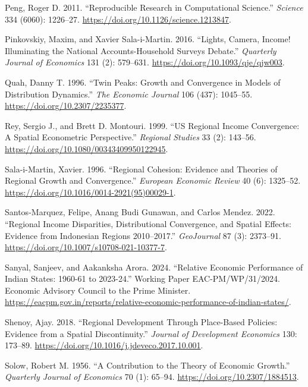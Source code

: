 \documentclass[
  letterpaper,
  DIV=11,
  numbers=noendperiod]{scrartcl}
\newlength{\cslhangindent}
\newenvironment{CSLReferences}[2] %
 {\begin{list}{}{%
  \setlength{\itemindent}{0pt}
  \setlength{\leftmargin}{0pt}
  \setlength{\parsep}{0pt}
  \ifodd #1
   \setlength{\leftmargin}{\cslhangindent}
   \setlength{\itemindent}{-1\cslhangindent}
  \fi
  \setlength{\itemsep}{#2\baselineskip}}}
 {\end{list}}
\begin{document}
\begin{CSLReferences}{1}{0}
Peng, Roger D. 2011. {``Reproducible Research in Computational
Science.''} \emph{Science} 334 (6060): 1226--27.
\url{https://doi.org/10.1126/science.1213847}.

Pinkovskiy, Maxim, and Xavier Sala-i-Martin. 2016. {``Lights, Camera,
Income! Illuminating the National Accounts-Household Surveys Debate.''}
\emph{Quarterly Journal of Economics} 131 (2): 579--631.
\url{https://doi.org/10.1093/qje/qjw003}.

Quah, Danny T. 1996. {``Twin Peaks: Growth and Convergence in Models of
Distribution Dynamics.''} \emph{The Economic Journal} 106 (437):
1045--55. \url{https://doi.org/10.2307/2235377}.

Rey, Sergio J., and Brett D. Montouri. 1999. {``{US} Regional Income
Convergence: A Spatial Econometric Perspective.''} \emph{Regional
Studies} 33 (2): 143--56.
\url{https://doi.org/10.1080/00343409950122945}.

Sala-i-Martin, Xavier. 1996. {``Regional Cohesion: Evidence and Theories
of Regional Growth and Convergence.''} \emph{European Economic Review}
40 (6): 1325--52. \url{https://doi.org/10.1016/0014-2921(95)00029-1}.

Santos-Marquez, Felipe, Anang Budi Gunawan, and Carlos Mendez. 2022.
{``Regional Income Disparities, Distributional Convergence, and Spatial
Effects: Evidence from {Indonesian} Regions 2010--2017.''}
\emph{GeoJournal} 87 (3): 2373--91.
\url{https://doi.org/10.1007/s10708-021-10377-7}.

Sanyal, Sanjeev, and Aakanksha Arora. 2024. {``Relative Economic
Performance of {Indian} States: 1960-61 to 2023-24.''} Working Paper
EAC-PM/WP/31/2024. Economic Advisory Council to the Prime Minister.
\url{https://eacpm.gov.in/reports/relative-economic-performance-of-indian-states/}.

Shenoy, Ajay. 2018. {``Regional Development Through Place-Based
Policies: Evidence from a Spatial Discontinuity.''} \emph{Journal of
Development Economics} 130: 173--89.
\url{https://doi.org/10.1016/j.jdeveco.2017.10.001}.

Solow, Robert M. 1956. {``A Contribution to the Theory of Economic
Growth.''} \emph{Quarterly Journal of Economics} 70 (1): 65--94.
\url{https://doi.org/10.2307/1884513}.


\end{CSLReferences}
\end{document}
